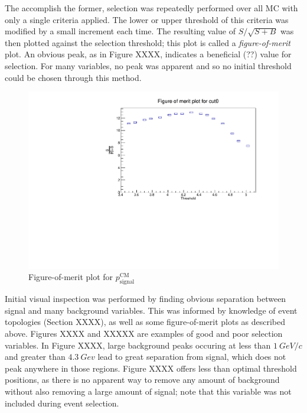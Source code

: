 \documentclass[12pt]{thesis}  %
\begin{document}
The accomplish the former, selection was repeatedly performed over all MC with only a single criteria applied. The lower or upper threshold of this criteria was modified by a small increment each time. The resulting value of $S/\sqrt{S+B}$ was then plotted against the selection threshold; this plot is called a \emph{figure-of-merit} plot. An obvious peak, as in Figure XXXX, indicates a beneficial (??) value for selection. For many variables, no peak was apparent and so no initial threshold could be chosen through this method.

\begin{figure}[h]
\centering
\includegraphics[width=0.7\linewidth]{images/fom-test.pdf}
\caption{Figure-of-merit plot for $p_{\text{signal}}^{\text{CM}}$}
\label{}
\end{figure}

Initial visual inspection was performed by finding obvious separation between signal and many background variables. This was informed by knowledge of event topologies (Section XXXX), as well as some figure-of-merit plots as described above. Figures XXXX and XXXXX are examples of good and poor selection variables. In Figure XXXX, large background peaks occuring at less than $\SI{1}{GeV/c}$ and greater than $\SI{4.3}{Gev}$ lead to great separation from signal, which does not peak anywhere in those regions. Figure XXXX offers less than optimal threshold positions, as there is no apparent way to remove any amount of background without also removing a large amount of signal; note that this variable was not included during event selection. 
\end{document}
